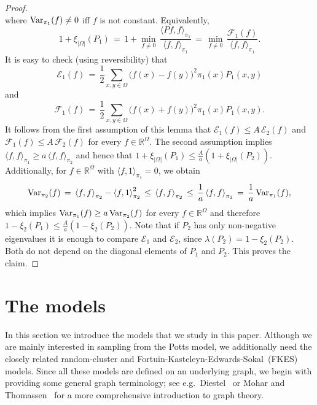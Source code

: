 \documentclass{dis}
\theoremstyle{citing}
\begin{document}
\begin{proof}
\[\]
where ${{\rm Var}}_{\pi_1}(f)\neq0$ iff $f$ is not constant.
Equivalently,
\[
1+\xi_{{\left\vert {\Omega} \right\vert}}(P_1) \,=\, 1+\min_{f\neq0}\,
	\frac{{\langle} Pf, f{\rangle}_{\pi_1}}{{\langle} f, f{\rangle}_{\pi_1}} 
\,=\, \min_{f\neq0}\, 
	\frac{{\mathcal{F}}_1(f)}{{\langle} f, f{\rangle}_{\pi_1}}.
\]
It is easy to check (using reversibility) that 
\[
{\mathcal{E}}_1(f) \,=\, \frac12\sum_{x,y\in{\Omega}}\bigl(f(x)-f(y)\bigr)^2 
	\pi_1(x) P_1(x,y)
\]
and
\[
{\mathcal{F}}_1(f) \,=\, \frac12\sum_{x,y\in{\Omega}}\bigl(f(x)+f(y)\bigr)^2 
	\pi_1(x) P_1(x,y).
\]
It follows from the first assumption of this lemma 
that ${\mathcal{E}}_1(f)\le A\,{\mathcal{E}}_2(f)$ 
and ${\mathcal{F}}_1(f)\le A\,{\mathcal{F}}_2(f)$ for every $f\in{\ensuremath{\mathbb{R}}}^{\Omega}$. 
The second assumption implies 
${\langle} f,f{\rangle}_{\pi_1}\ge a \,{\langle} f,f{\rangle}_{\pi_2}$ and hence that 
$1+\xi_{{\left\vert {\Omega} \right\vert}}(P_1)\le\frac{A}{a}(1+\xi_{{\left\vert {\Omega} \right\vert}}(P_2))$.
Additionally, for $f\in{\ensuremath{\mathbb{R}}}^{\Omega}$ with ${\langle} f,1{\rangle}_{\pi_1}=0$, 
we obtain
\[
{{\rm Var}}_{\pi_2}(f) \,=\, {\langle} f,f{\rangle}_{\pi_2} - {\langle} f,1{\rangle}_{\pi_2}^2 
\,\le\, {\langle} f,f{\rangle}_{\pi_2} 
\,\le\, \frac1a\, {\langle} f,f{\rangle}_{\pi_1} 
\,=\, \frac1a\,{{\rm Var}}_{\pi_1}(f),
\]
which implies ${{\rm Var}}_{\pi_1}(f)\ge a\,{{\rm Var}}_{\pi_2}(f)$ for every 
$f\in{\ensuremath{\mathbb{R}}}^{\Omega}$ and therefore 
$1-\xi_2(P_1)\le\frac{A}{a}(1-\xi_2(P_2))$. 
Note that if $P_2$ has only non-negative eigenvalues 
it is enough to compare ${\mathcal{E}}_1$ and ${\mathcal{E}}_2$, 
since $\lambda(P_2)=1-\xi_2(P_2)$. Both do not 
depend on the diagonal elements of $P_1$ and $P_2$.
This proves the claim.
\end{proof}

\section{The models} \label{sec:2_models}

In this section we introduce the models that 
we study in this paper. 
Although we are mainly interested in sampling from the 
Potts model, we additionally need the closely related 
random-cluster and {Fortuin-Kasteleyn-Edwards-Sokal}\ ({FKES}) models. 
Since all these models are defined on an underlying graph, 
we begin with providing some general graph terminology; 
see e.g.~Diestel~\cite{Diestel} or Mohar and Thomassen~\cite{Mohar} 
for a more comprehensive introduction to graph theory.
\end{document}
